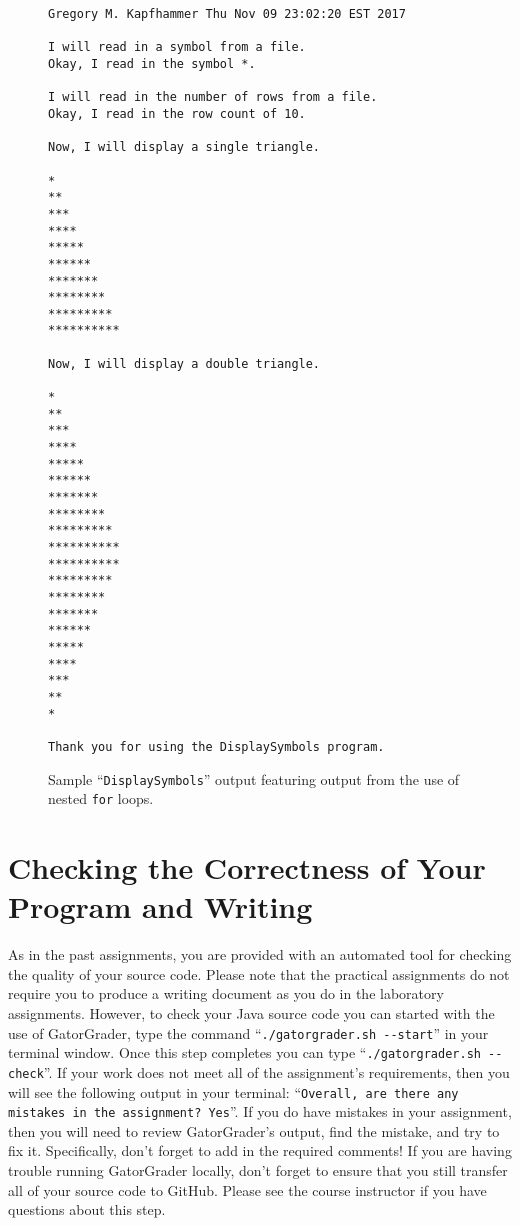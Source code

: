 \documentclass[11pt]{article}
\newcommand{\gatorgraderstart}{\command{./gatorgrader.sh --start}}
\newcommand{\gatorgradercheck}{\command{./gatorgrader.sh --check}}
\newcommand{\command}[1]{``\lstinline{#1}''}
\newcommand{\program}[1]{\lstinline{#1}}
\begin{document}
\begin{figure}[tb]
\begin{Verbatim}[commandchars=\\\{\}]
Gregory M. Kapfhammer Thu Nov 09 23:02:20 EST 2017

I will read in a symbol from a file.
Okay, I read in the symbol *.

I will read in the number of rows from a file.
Okay, I read in the row count of 10.

Now, I will display a single triangle.

*
**
***
****
*****
******
*******
********
*********
**********

Now, I will display a double triangle.

*
**
***
****
*****
******
*******
********
*********
**********
**********
*********
********
*******
******
*****
****
***
**
*

Thank you for using the DisplaySymbols program.

\end{Verbatim}
\vspace*{-.1in}
\caption{Sample ``{\tt DisplaySymbols}'' output featuring output from the use of nested \program{for} loops.}
\label{mad}
\end{figure}

\section*{Checking the Correctness of Your Program and Writing}

As in the past assignments, you are provided with an automated tool for checking the quality of your source code. Please
note that the practical assignments do not require you to produce a writing document as you do in the laboratory
assignments. However, to check your Java source code you can started with the use of GatorGrader, type the command
\gatorgraderstart{} in your terminal window. Once this step completes you can type \gatorgradercheck{}. If your work
does not meet all of the assignment's requirements, then you will see the following output in your terminal:
\command{Overall, are there any mistakes in the assignment? Yes}. If you do have mistakes in your assignment, then you
will need to review GatorGrader's output, find the mistake, and try to fix it. Specifically, don't forget to add in the
required comments! If you are having trouble running GatorGrader locally, don't forget to ensure that you still transfer
all of your source code to GitHub. Please see the course instructor if you have questions about this step.
\end{document}
